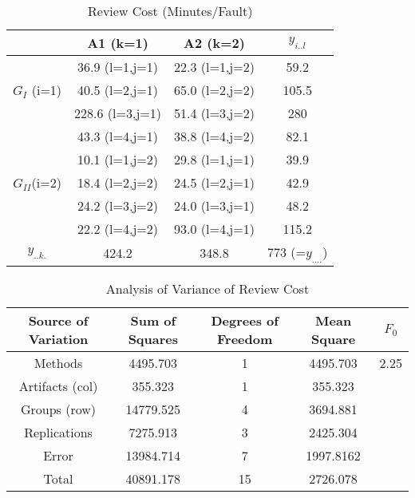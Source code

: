 \begin{table}[h]
\begin{center}
\begin{tabular}{|c|c|c|c|}
\hline
          & A1 (k=1)     & A2 (k=2) & $y_{i..l}$ \\
\hline                  
          & 36.9 (l=1,j=1)  & 22.3 (l=1,j=2) & 59.2 \\
$G_I$ (i=1) & 40.5 (l=2,j=1)  & 65.0 (l=2,j=2) & 105.5 \\
          & 228.6 (l=3,j=1)  & 51.4 (l=3,j=2) & 280\\
          & 43.3 (l=4,j=1)  & 38.8 (l=4,j=2) & 82.1\\
\hline                  
          & 10.1 (l=1,j=2)  & 29.8 (l=1,j=1) & 39.9\\
$G_{II}$(i=2) & 18.4 (l=2,j=2)  & 24.5 (l=2,j=1) & 42.9\\
           & 24.2 (l=3,j=2)  & 24.0 (l=3,j=1) & 48.2\\
          & 22.2 (l=4,j=2)  & 93.0 (l=4,j=1) & 115.2\\
\hline
$y_{..k.}$ & 424.2          & 348.8          & 773 (=$y_{....}$) \\
\hline
\end{tabular}
\end{center}
\caption{Review Cost (Minutes/Fault)}
\label{review-cost}
\end{table}


\begin{table}[tb]
\begin{center}
\begin{tabular}{|c|c|c|c|c|}
\hline
Source of Variation & Sum of Squares & Degrees of Freedom & Mean Square & $F_0$\\
\hline
Methods        &  4495.703   & 1    & 4495.703 & 2.25\\
Artifacts (col) &  355.323   & 1   & 355.323  &  \\
Groups (row)    & 14779.525  & 4    & 3694.881 &  \\
Replications    & 7275.913    & 3    & 2425.304     &  \\
Error             & 13984.714  & 7   & 1997.8162 &  \\
Total             & 40891.178   & 15   & 2726.078      &  \\
\hline
\end{tabular}
\end{center}
\caption{Analysis of Variance of Review Cost}
\label{analysis-variance2}
\end{table}

